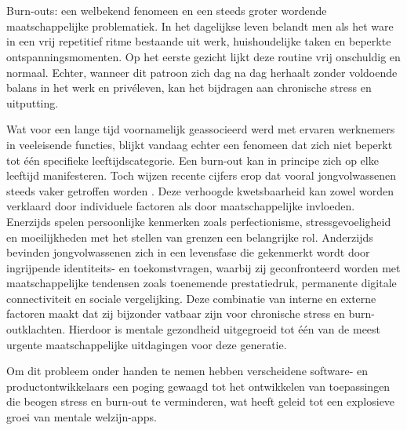 
\chapter{}%
\label{ch:inleiding}

Burn-outs: een welbekend fenomeen en een steeds groter wordende maatschappelijke problematiek. In het dagelijkse leven belandt men als het ware in een vrij repetitief ritme bestaande uit werk, huishoudelijke taken en beperkte ontspanningsmomenten. Op het eerste gezicht lijkt deze routine vrij onschuldig en normaal. Echter, wanneer dit patroon zich dag na dag herhaalt zonder voldoende balans in het werk en privéleven, kan het bijdragen aan chronische stress en uitputting. 

\vspace{1em}

Wat voor een lange tijd voornamelijk geassocieerd werd met ervaren werknemers in veeleisende functies, blijkt vandaag echter een fenomeen dat zich niet beperkt tot één specifieke leeftijdscategorie. Een burn-out kan in principe zich op elke leeftijd manifesteren. Toch wijzen recente cijfers erop dat vooral jongvolwassenen steeds vaker getroffen worden \autocite{RIZIV2023_invaliditeit_burnout}. Deze verhoogde kwetsbaarheid kan zowel worden verklaard door individuele factoren als door maatschappelijke invloeden. Enerzijds spelen persoonlijke kenmerken zoals perfectionisme, stressgevoeligheid en moeilijkheden met het stellen van grenzen een belangrijke rol. Anderzijds bevinden jongvolwassenen zich in een levensfase die gekenmerkt wordt door ingrijpende identiteits- en toekomstvragen, waarbij zij geconfronteerd worden met maatschappelijke tendensen zoals toenemende prestatiedruk, permanente digitale connectiviteit en sociale vergelijking. Deze combinatie van interne en externe factoren maakt dat zij bijzonder vatbaar zijn voor chronische stress en burn-outklachten. Hierdoor is mentale gezondheid uitgegroeid tot één van de meest urgente maatschappelijke uitdagingen voor deze generatie.

\newpage

Om dit probleem onder handen te nemen hebben verscheidene software- en productontwikkelaars een poging gewaagd tot het ontwikkelen van toepassingen die beogen stress en burn-out te verminderen, wat heeft geleid tot een explosieve groei van mentale welzijn-apps. 

